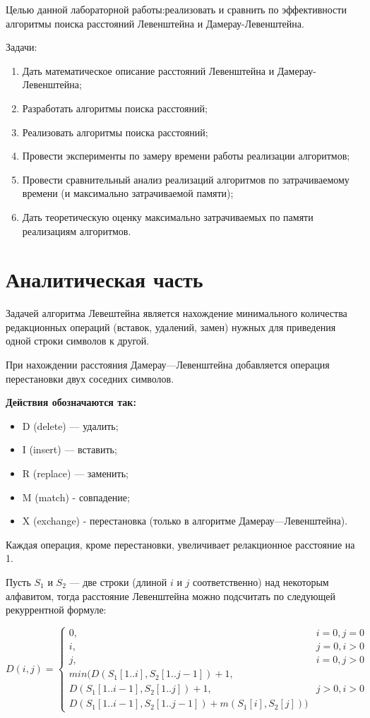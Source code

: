 \documentclass[12pt]{report}
\begin{document}
	Целью данной лабораторной работы:реализовать и сравнить по эффективности алгоритмы поиска расстояний Левенштейна и Дамерау-Левенштейна.
	
	Задачи:
	\begin{enumerate}
		\item Дать математическое описание расстояний Левенштейна и Дамерау-Левенштейна;
		\item Разработать алгоритмы поиска расстояний;
		\item Реализовать алгоритмы поиска расстояний;
		\item Провести эксперименты по замеру времени работы реализации алгоритмов;
		\item Провести сравнительный анализ реализаций алгоритмов по затрачиваемому времени (и максимально затрачиваемой памяти);
		\item Дать теоретическую оценку максимально затрачиваемых по памяти реализациям алгоритмов.
	\end{enumerate}
	
	\chapter{Аналитическая часть} 
	Задачей алгоритма Левештейна является нахождение минимального количества редакционных операций (вставок, удалений, замен) нужных для приведения одной строки символов к другой.
	
	При нахождении расстояния Дамерау—Левенштейна добавляется операция перестановки двух соседних символов. 
	
	\textbf{Действия обозначаются так:} 
	\begin{itemize}
		\item D (delete) — удалить;
		\item I (insert) — вставить;
		\item R (replace) — заменить;
		\item M (match) - совпадение;
		\item X (exchange) - перестановка (только в алгоритме Дамерау—Левенштейна).
	\end{itemize}
Каждая операция, кроме перестановки, увеличивает релакционное расстояние на 1.


Пусть $S_{1}$ и $S_{2}$ — две строки (длиной $i$ и $j$ соответственно) над некоторым алфавитом, тогда расстояние Левенштейна можно подсчитать по следующей рекуррентной формуле:


\begin{equation}
	D(i,j) = \left\{ \begin{array}{ll}
		0, & \textrm{$i = 0, j = 0$}\\
		i, & \textrm{$j = 0, i > 0$}\\
		j, & \textrm{$i = 0, j > 0$}\\
		min(D(S_{1}[1..i],S_{2}[1..j-1])+1,\\
		D(S_{1}[1..i-1],S_{2}[1..j]) +1, &\textrm{$j>0, i>0$}\\
		D(S_{1}[1..i-1],S_{2}[1..j-1]) + m(S_{1}[i], S_{2}[j]))
	\end{array}\right.
\end{equation}
\end{document}
